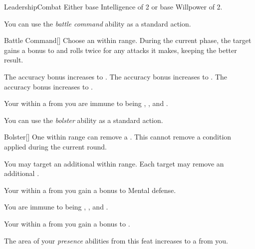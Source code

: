     \begin{feat}{Leadership}{Combat}
        \featpre Either base Intelligence of 2 or base Willpower of 2.

         You can use the \textit{battle command} ability as a standard action.
        \begin{freeability}{Battle Command}[]
            Choose an  within \rngmed range.
            During the current phase, the target gains a  bonus to  and rolls twice for any attacks it makes, keeping the better result.

            \rankline
             The accuracy bonus increases to .
             The accuracy bonus increases to .
             The accuracy bonus increases to .
        \end{freeability}

         Your  within a \arealarge {} from you are immune to being , , and .

         You can use the \textit{bolster} ability as a standard action.
        \begin{freeability}{Bolster}[]
            One  within \rngmed range can remove a .
            This cannot remove a condition applied during the current round.

            \rankline
             You may target an additional  within range.
             Each target may remove an additional .
        \end{freeability}

         Your  within a \arealarge {} from you gain a  bonus to Mental defense.

         You are immune to being , , and .

         Your  within a \arealarge {} from you gain a  bonus to .

         The area of your \textit{presence} abilities from this feat increases to a \areahuge {} from you.
    \end{feat}

